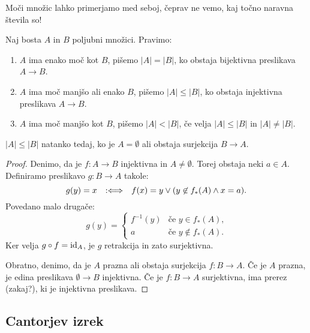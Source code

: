 Moči množic lahko primerjamo med seboj, čeprav ne vemo, kaj točno naravna števila so!

\begin{definicija}
  Naj bosta $A$ in $B$ poljubni množici. Pravimo:
  \begin{enumerate}
  \item $A$ ima enako moč kot $B$, pišemo $|A| = |B|$, ko obstaja bijektivna preslikava $A \to B$.
  \item $A$ ima moč manjšo ali enako $B$, pišemo $|A| \leq |B|$, ko obstaja injektivna preslikava $A \to B$.
  \item $A$ ima moč manjšo kot $B$, pišemo $|A| < |B|$, če velja $|A| \leq |B|$ in $|A| \neq |B|$.
  \end{enumerate}
\end{definicija}

\begin{izrek}
  \label{izr:leq-iff-empty-or-onto}
  $|A| \leq |B|$ natanko tedaj, ko je $A = \emptyset$ ali obstaja surjekcija $B \to A$.
\end{izrek}

\begin{proof}
  Denimo, da je $f : A \to B$ injektivna in $A \neq \emptyset$. Torej obstaja neki $a \in A$.
  Definiramo preslikavo $g : B \to A$ takole:
  \begin{equation*}
    g(y) = x  \defiff f(x) = y \lor (y \not\in f_{*}(A) \land x = a).
  \end{equation*}
  Povedano malo drugače:
  \begin{equation*}
    g(y) =
    \begin{cases}
      f^{-1}(y) & \text{če $y \in f_{*}(A)$,} \\
      a         & \text{če $y \not\in f_{*}(A)$.}
    \end{cases}
  \end{equation*}
  Ker velja $g \circ f = \id[A]$, je $g$ retrakcija in zato surjektivna.

  Obratno, denimo, da je $A$ prazna ali obstaja surjekcija $f : B \to A$. Če je $A$
  prazna, je edina preslikava $\emptyset \to B$ injektivna. Če je $f : B \to A$ surjektivna,
  ima prerez (zakaj?), ki je injektivna preslikava.
\end{proof}


\subsection{Cantorjev izrek}

